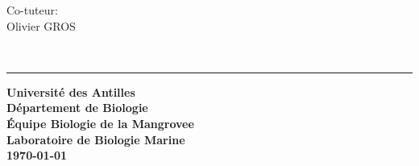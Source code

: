 \begin{titlepage}
\begin{center}
\begin{minipage}{0.3\textwidth}
\begin{flushleft}
				Co-tuteur: \\
				\hspace{0.2cm} Olivier \textsc{GROS}
			\end{flushleft}
		\end{minipage} \\[3cm]

        \rule{\linewidth}{0.5mm}
        \vfill
        
        \textbf{Université des Antilles} \\
        \textbf{Département de Biologie} \\
        \textbf{Équipe Biologie de la Mangrovee} \\
        \textbf{Laboratoire de Biologie Marine} \\
        \vspace{0.5cm}
        \textbf{\today {}}
         
    \end{center}
\end{titlepage}